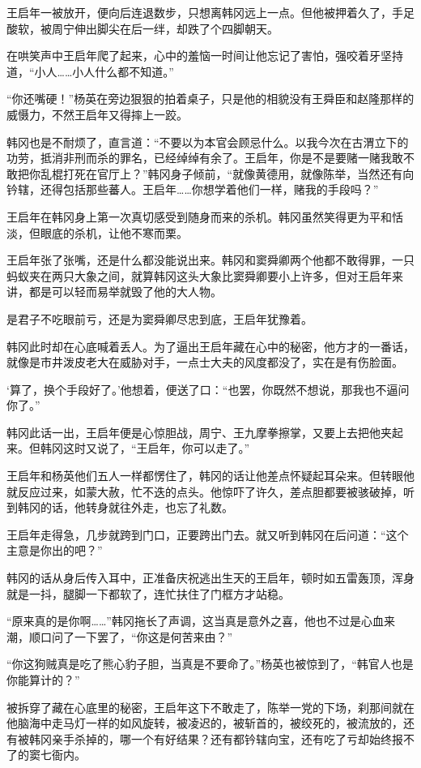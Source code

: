 王启年一被放开，便向后连退数步，只想离韩冈远上一点。但他被押着久了，手足酸软，被周宁伸出脚尖在后一绊，却跌了个四脚朝天。

在哄笑声中王启年爬了起来，心中的羞恼一时间让他忘记了害怕，强咬着牙坚持道，“小人……小人什么都不知道。”

“你还嘴硬！”杨英在旁边狠狠的拍着桌子，只是他的相貌没有王舜臣和赵隆那样的威慑力，不然王启年又得摔上一跤。

韩冈也是不耐烦了，直言道：“不要以为本官会顾忌什么。以我今次在古渭立下的功劳，抵消非刑而杀的罪名，已经绰绰有余了。王启年，你是不是要赌一赌我敢不敢把你乱棍打死在官厅上？”韩冈身子倾前，“就像黄德用，就像陈举，当然还有向钤辖，还得包括那些蕃人。王启年……你想学着他们一样，赌我的手段吗？”

王启年在韩冈身上第一次真切感受到随身而来的杀机。韩冈虽然笑得更为平和恬淡，但眼底的杀机，让他不寒而栗。

王启年张了张嘴，还是什么都没能说出来。韩冈和窦舜卿两个他都不敢得罪，一只蚂蚁夹在两只大象之间，就算韩冈这头大象比窦舜卿要小上许多，但对王启年来讲，都是可以轻而易举就毁了他的大人物。

是君子不吃眼前亏，还是为窦舜卿尽忠到底，王启年犹豫着。

韩冈此时却在心底喊着丢人。为了逼出王启年藏在心中的秘密，他方才的一番话，就像是市井泼皮老大在威胁对手，一点士大夫的风度都没了，实在是有伤脸面。

‘算了，换个手段好了。’他想着，便送了口：“也罢，你既然不想说，那我也不逼问你了。”

韩冈此话一出，王启年便是心惊胆战，周宁、王九摩拳擦掌，又要上去把他夹起来。但韩冈这时又说了，“王启年，你可以走了。”

王启年和杨英他们五人一样都愣住了，韩冈的话让他差点怀疑起耳朵来。但转眼他就反应过来，如蒙大赦，忙不迭的点头。他惊吓了许久，差点胆都要被骇破掉，听到韩冈的话，他转身就往外走，也忘了礼数。

王启年走得急，几步就跨到门口，正要跨出门去。就又听到韩冈在后问道：“这个主意是你出的吧？”

韩冈的话从身后传入耳中，正准备庆祝逃出生天的王启年，顿时如五雷轰顶，浑身就是一抖，腿脚一下都软了，连忙扶住了门框方才站稳。

“原来真的是你啊……”韩冈拖长了声调，这当真是意外之喜，他也不过是心血来潮，顺口问了一下罢了，“你这是何苦来由？”

“你这狗贼真是吃了熊心豹子胆，当真是不要命了。”杨英也被惊到了，“韩官人也是你能算计的？”

被拆穿了藏在心底里的秘密，王启年这下不敢走了，陈举一党的下场，刹那间就在他脑海中走马灯一样的如风旋转，被凌迟的，被斩首的，被绞死的，被流放的，还有被韩冈亲手杀掉的，哪一个有好结果？还有都钤辖向宝，还有吃了亏却始终报不了的窦七衙内。

